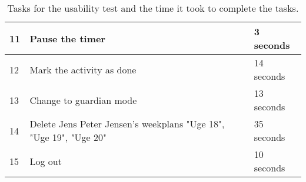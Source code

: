 \begin{table}[H]
\begin{tabular}{|p{1.3cm}|p{10cm}|p{1.7cm}|}
    11 & Pause the timer                                                                                                                & 3 seconds   \\ \hline
    12 & Mark the activity as done                                                                                                    & 14 seconds   \\ \hline
    13 & Change to guardian mode                                                                                                     & 13 seconds   \\ \hline
    14 & Delete Jens Peter Jensen's weekplans "Uge 18", "Uge 19", "Uge 20"                                                           & 35 seconds   \\ \hline
    15 & Log out                                                                                                                     & 10 seconds   \\ \hline
    \end{tabular}
    \caption{Tasks for the usability test and the time it took to complete the tasks.}\label{table:emil_usability_tasks}
\end{table}

